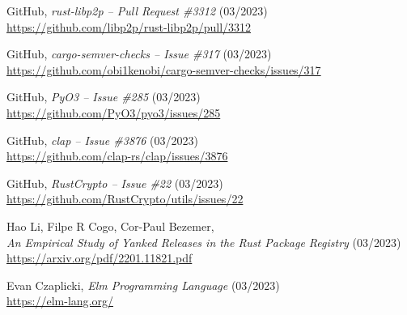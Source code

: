 \documentclass[licencjacka,en]{pracamgr}
\begin{document}
\begin{thebibliography}{99}








 GitHub,
	\textit{rust-libp2p -- Pull Request \#3312} (03/2023) \\
	\url{https://github.com/libp2p/rust-libp2p/pull/3312}



 GitHub,
	\textit{cargo-semver-checks -- Issue \#317} (03/2023) \\
	\url{https://github.com/obi1kenobi/cargo-semver-checks/issues/317}



 GitHub,
    \textit{PyO3 -- Issue \#285} (03/2023) \\
    \url{https://github.com/PyO3/pyo3/issues/285}

 GitHub,
    \textit{clap -- Issue \#3876} (03/2023) \\
    \url{https://github.com/clap-rs/clap/issues/3876}

 GitHub,
    \textit{RustCrypto -- Issue \#22} (03/2023) \\
    \url{https://github.com/RustCrypto/utils/issues/22}

 Hao Li, Filpe R Cogo, Cor-Paul Bezemer, \\
    \textit{An Empirical Study of Yanked Releases in the Rust Package Registry} (03/2023) \\
	\url{https://arxiv.org/pdf/2201.11821.pdf}



 Evan Czaplicki,
    \textit{Elm Programming Language} (03/2023) \\
    \url{https://elm-lang.org/}



\end{thebibliography}
\end{document}
